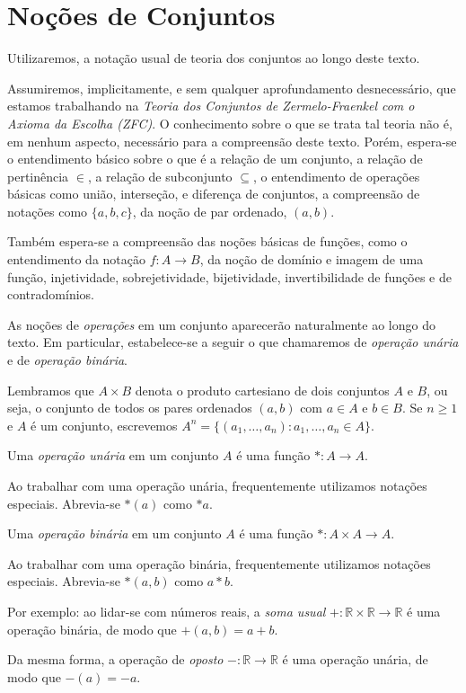 \section{Noções de Conjuntos}
Utilizaremos, a notação usual de teoria dos conjuntos ao longo deste texto.

Assumiremos, implicitamente, e sem qualquer aprofundamento desnecessário, que estamos trabalhando na \emph{Teoria dos Conjuntos de Zermelo-Fraenkel com o Axioma da Escolha (ZFC)}.
O conhecimento sobre o que se trata tal teoria não é, em nenhum aspecto, necessário para a compreensão deste texto.
Porém, espera-se o entendimento básico sobre o que é a relação de um conjunto, a relação de pertinência $\in$, a relação de subconjunto $\subseteq$, o entendimento de operações básicas como união, interseção, e diferença de conjuntos, a compreensão de notações como $\{a, b, c\}$, da noção de par ordenado, $(a, b)$.

Também espera-se a compreensão das noções básicas de funções, como o entendimento da notação $f: A \to B$, da noção de domínio e imagem de uma função, injetividade, sobrejetividade, bijetividade, invertibilidade de funções e de contradomínios.

As noções de \emph{operações} em um conjunto aparecerão naturalmente ao longo do texto.
Em particular, estabelece-se a seguir o que chamaremos de \emph{operação unária} e de \emph{operação binária}.

Lembramos que $A\times B$ denota o produto cartesiano de dois conjuntos $A$ e $B$, ou seja, o conjunto de todos os pares ordenados $(a, b)$ com $a \in A$ e $b \in B$.
Se $n\geq 1$ e $A$ é um conjunto, escrevemos $A^n=\{(a_1, \dots, a_n): a_1, \dots, a_n \in A\}$.

\begin{definition}[Operações]
    Uma \emph{operação unária} em um conjunto $A$ é uma função $*: A \to A$.

    Ao trabalhar com uma operação unária, frequentemente utilizamos notações especiais. Abrevia-se $*(a)$ como $*a$.

    Uma \emph{operação binária} em um conjunto $A$ é uma função $*: A \times A \to A$.

    Ao trabalhar com uma operação binária, frequentemente utilizamos notações especiais. Abrevia-se $*(a, b)$ como $a * b$.
\end{definition}

Por exemplo: ao lidar-se com números reais, a \emph{soma usual} $+: \mathbb{R} \times \mathbb{R} \to \mathbb{R}$ é uma operação binária, de modo que $+(a, b)=a+b$.

Da mesma forma, a operação de \emph{oposto} $-: \mathbb{R} \to \mathbb{R}$ é uma operação unária, de modo que $-(a)= -a$.





